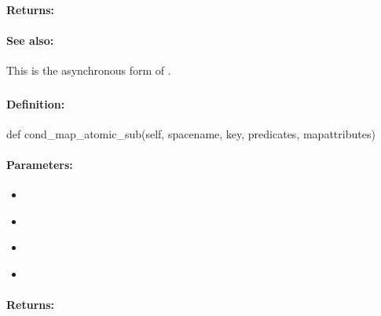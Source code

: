 \paragraph{Returns:}


\paragraph{See also:}  This is the asynchronous form of .

\pagebreak
\subsubsection{}
\label{api:python:cond_map_atomic_sub}


\paragraph{Definition:}
\begin{pythoncode}
def cond_map_atomic_sub(self, spacename, key, predicates, mapattributes)
\end{pythoncode}

\paragraph{Parameters:}
\begin{itemize}[noitemsep]
\item {}\\

\item {}\\

\item {}\\

\item {}\\

\end{itemize}

\paragraph{Returns:}


